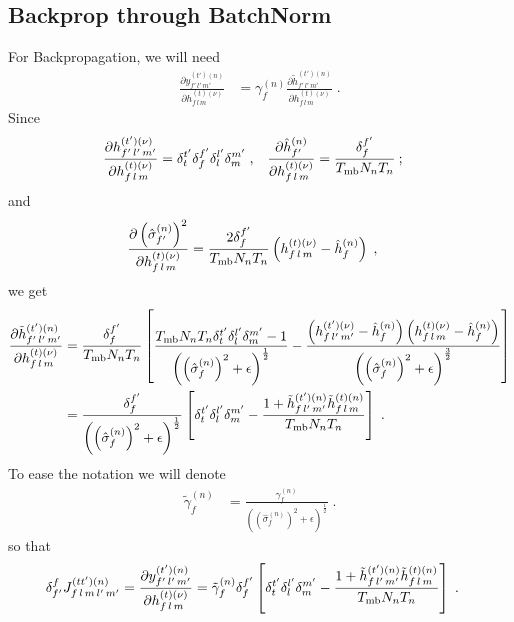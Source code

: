 \begin{subappendices}
\section{Backprop through BatchNorm} \label{sec:appenbatchnorm-vgg}


For Backpropagation, we will need
\begin{align}
\frac{\partial y^{(t')(n)}_{f'\,l'\,m'}}{\partial h_{f\,l\,m}^{(t)(\nu)}}&=
%
\gamma^{(n)}_f\frac{\partial \tilde{h}_{f'\,l'\,m'}^{(t')(n)}}{\partial h_{f\,l\,m}^{(t)(\nu)}}\;.
\end{align}
Since
\begin{align}
\frac{\partial h^{(t')(\nu)}_{f'\,l'\,m'}}{\partial h_{f\,l\,m}^{(t)(\nu)}}&=\delta^{t'}_t\delta^{f'}_f
%
\delta^{l'}_l\delta^{m'}_m\;,&
%
\frac{\partial \hat{h}_{f'}^{(n)}}{\partial h_{f\,l\,m}^{(t)(\nu)}}&=\frac{\delta^{f'}_f}{T_{{\rm mb}}N_nT_n}\:;
\end{align}
and
\begin{align}
\frac{\partial \left(\hat{\sigma}_{f'}^{(n)}\right)^2}{\partial h_{f\,l\,m}^{(t)(\nu)}}&=
%
\frac{2\delta^{f'}_f}{T_{{\rm mb}}N_nT_n}\left(h_{f\,l\,m}^{(t)(\nu)}-\hat{h}_{f}^{(n)}\right)\;,
\end{align}
we get
\begin{align}
\frac{\partial \tilde{h}_{f'\,l'\,m'}^{(t')(n)}}{\partial h_{f\,l\,m}^{(t)(\nu)}}&=
%
\frac{\delta^{f'}_f}{T_{{\rm mb}}N_nT_n}\left[\frac{T_{{\rm mb}}N_nT_n\delta^{t'}_t
%
\delta^{l'}_l\delta^{m'}_m-1}
%
{\left(\left(\hat{\sigma}_{f}^{(n)}\right)^2+\epsilon\right)^\frac12}-
%
\frac{\left(h_{f\,l'\,m'}^{(t')(\nu)}-\hat{h}_{f}^{(n)}\right)\left(h_{f\,l\,m}^{(t)(\nu)}-\hat{h}_{f}^{(n)}\right)}
%
{\left(\left(\hat{\sigma}_{f}^{(n)}\right)^2+\epsilon\right)^\frac32}\right]\notag\\
%
&=\frac{\delta^{f'}_f}{\left(\left(\hat{\sigma}_{f}^{(n)}\right)^2+\epsilon\right)^\frac12}
%
\left[\delta^{t'}_t\delta^{l'}_l\delta^{m'}_m-
%
\frac{1+\tilde{h}_{f\,l'\,m'}^{(t')(n)}\tilde{h}_{f\,l\,m}^{(t)(n)}}{T_{{\rm mb}}N_nT_n}\right]\;.
\end{align}
To ease the notation we will denote
\begin{align}
\tilde{\gamma}^{(n)}_f&=
%
\frac{\gamma^{(n)}_f}{\left(\left(\hat{\sigma}_{f}^{(n)}\right)^2+\epsilon\right)^\frac12}\;.
\end{align}
%
%
%
so that
\begin{align}
\delta^f_{f'}J^{(tt')(n)}_{f\,l\,m\,l'\,m'}&=
%
\frac{\partial y_{f'\,l'\,m'}^{(t')(n)}}{\partial h_{f\,l\,m}^{(t)(\nu)}}=
%
\tilde{\gamma}^{(n)}_f \delta^{f'}_f\left[\delta^{t'}_t\delta^{l'}_l\delta^{m'}_m-
%
\frac{1+\tilde{h}_{f\,l'\,m'}^{(t')(n)}\tilde{h}_{f\,l\,m}^{(t)(n)}}{T_{{\rm mb}}N_nT_n}\right]\;.
\end{align}


\end{subappendices}
